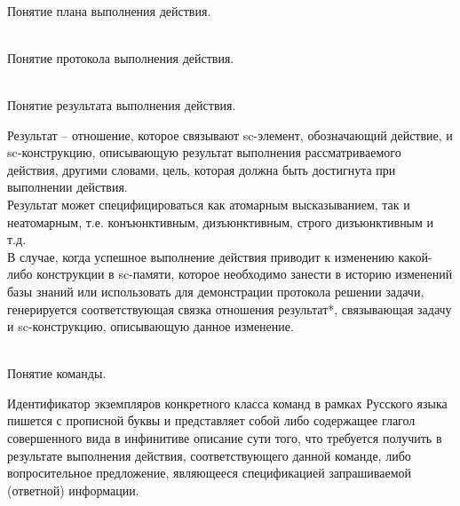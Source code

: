 \begin{frame}{\\Понятие плана выполнения действия.}
	\topline
	\justifying
\end{frame}

\begin{frame}{\\Понятие протокола выполнения действия.}
	\topline
	\justifying
 
\end{frame}

\begin{frame}{\\Понятие результата выполнения действия.}
	\topline
	\justifying
 
    Результат -- отношение, которое  связывают sc-элемент, обозначающий действие, и sc-конструкцию, описывающую результат выполнения рассматриваемого действия, другими словами, цель, которая должна быть достигнута при выполнении действия.\\
    Результат может специфицироваться как атомарным высказыванием, так и неатомарным, т.е. конъюнктивным, дизъюнктивным, строго дизъюнктивным и т.д.\\
    В случае, когда успешное выполнение действия приводит к изменению какой-либо конструкции в sc-памяти,  которое необходимо занести в историю изменений базы знаний или использовать для демонстрации протокола решении задачи, генерируется соответствующая связка отношения результат*, связывающая  задачу и sc-конструкцию, описывающую данное изменение. 
\end{frame}


\begin{frame}{\\Понятие команды.}
	\topline
	\justifying

    
   Идентификатор экземпляров конкретного класса команд в рамках Русского языка пишется с прописной буквы и представляет собой либо содержащее глагол совершенного вида в инфинитиве описание сути того, что требуется получить в результате выполнения действия, соответствующего данной команде, либо вопросительное предложение, являющееся спецификацией запрашиваемой (ответной) информации.
\end{frame}



